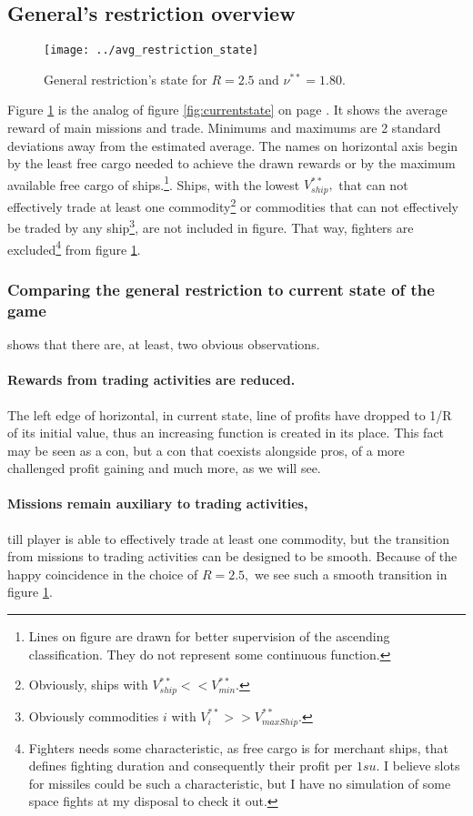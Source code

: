 \documentclass[]{article}
\begin{document}
\subsection{General's restriction overview}
\begin{figure}[h]
	\centering
	\texttt{[image: ../avg\_restriction\_state]}
	\caption{General restriction's state for $R=2.5$ and $\nu^{**}=1.80.$}
	\label{fig:avgrestrictionstate}
\end{figure}
Figure \ref{fig:avgrestrictionstate} is the analog of figure \ref{fig:currentstate} on page \pageref{fig:currentstate}. It shows the average reward of main missions and trade. Minimums and maximums are 2 standard deviations away from the estimated average. The names on horizontal axis begin by the least free cargo needed to achieve the drawn rewards or by the maximum available free cargo of ships.\footnote{Lines on figure are drawn for better supervision of the ascending classification. They do not represent some continuous function.}. Ships, with the lowest $V^{**}_{ship},$ that can not effectively trade at least one commodity\footnote{Obviously,  ships with $V^{**}_{ship}<< V^{**}_{min}.$} or commodities that can not  effectively be traded by any ship\footnote{Obviously commodities $i$ with $V^{**}_{i}>>V^{**}_{maxShip}.$}, are not included in figure. That way, fighters are excluded\footnote{Fighters needs some characteristic, as free cargo is for merchant ships, that defines fighting duration and consequently their profit per $1su.$ I believe slots for missiles could be such a characteristic, but I have no simulation of some space fights  at my disposal to check it out.} from figure \ref{fig:avgrestrictionstate}.
\subsubsection{Comparing the general restriction to current state of the game} shows that there are, at least, two obvious observations.
\paragraph{Rewards from trading activities are reduced.} The left edge of horizontal, in current state, line of profits have dropped to 1/R of its initial value, thus an increasing function is created in its place. This fact may be seen as a con, but a con that coexists alongside pros, of a more challenged profit gaining and much more, as we will see.
\paragraph{Missions remain auxiliary to trading activities,} till player is able to effectively trade at least one commodity, but the transition from missions to trading activities can be designed to be smooth. Because of the happy coincidence in the choice of $R=2.5,$ we see such a smooth transition in figure \ref{fig:avgrestrictionstate}.
\end{document}
